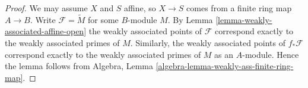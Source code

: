 \documentclass[10pt,a4paper]{amsart}
\theoremstyle{plain}
\theoremstyle{definition}
\theoremstyle{remark}
\numberwithin{equation}{subsection}
\begin{document}
\begin{proof}
We may assume $X$ and $S$ affine, so $X \to S$ comes from a finite ring map
$A \to B$. Write $\mathcal{F} = \widetilde M$ for some $B$-module $M$. By
Lemma \ref{lemma-weakly-associated-affine-open}
the weakly associated points of $\mathcal{F}$ correspond exactly to the
weakly associated primes of $M$. Similarly, the weakly associated points
of $f_*\mathcal{F}$ correspond exactly to the weakly associated primes
of $M$ as an $A$-module. Hence the lemma follows from
Algebra, Lemma \ref{algebra-lemma-weakly-ass-finite-ring-map}.
\end{proof}
\end{document}
